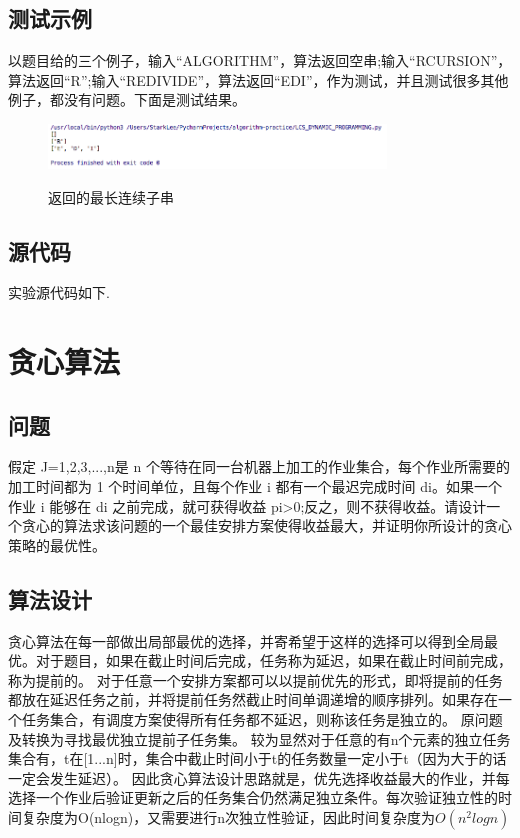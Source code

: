 \documentclass[UTF8]{ctexart}
\begin{document}
\subsection{测试示例}
以题目给的三个例子，输入“ALGORITHM”，算法返回空串;输入“RCURSION”，算法返回“R”;输入“REDIVIDE”，算法返回“EDI”，作为测试，并且测试很多其他例子，都没有问题。下面是测试结果。
\begin{figure}[H]
  \centering
  \label{fig:Per6A}\includegraphics[width=0.8\textwidth]{result2.png}\
  \caption{返回的最长连续子串}
  \label{fig:oscil}
\end{figure}

\subsection{源代码}
实验源代码如下.  \vspace{5mm}
	
	\vspace{3mm}




\newpage
\section{贪心算法}
\subsection{问题}
假定 J={1,2,3,...,n}是 n 个等待在同一台机器上加工的作业集合，每个作业所需要的加工时间都为 1 个时间单位，且每个作业 i 都有一个最迟完成时间 di。如果一个作业 i 能够在 di 之前完成，就可获得收益 pi>0;反之，则不获得收益。请设计一个贪心的算法求该问题的一个最佳安排方案使得收益最大，并证明你所设计的贪心策略的最优性。\vspace{3mm}



\subsection{算法设计}
贪心算法在每一部做出局部最优的选择，并寄希望于这样的选择可以得到全局最优。对于题目，如果在截止时间后完成，任务称为延迟，如果在截止时间前完成，称为提前的。 对于任意一个安排方案都可以以提前优先的形式，即将提前的任务都放在延迟任务之前，并将提前任务然截止时间单调递增的顺序排列。如果存在一个任务集合，有调度方案使得所有任务都不延迟，则称该任务是独立的。 原问题及转换为寻找最优独立提前子任务集。 较为显然对于任意的有n个元素的独立任务集合有，t在[1...n]时，集合中截止时间小于t的任务数量一定小于t（因为大于的话一定会发生延迟）。 因此贪心算法设计思路就是，优先选择收益最大的作业，并每选择一个作业后验证更新之后的任务集合仍然满足独立条件。每次验证独立性的时间复杂度为O(nlogn)，又需要进行n次独立性验证，因此时间复杂度为$O(n^2logn)$
\end{document}
